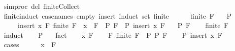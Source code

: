 \begin{isabellebody}
\endisatagML
{\isafoldML}%
%
\isadelimML
\isanewline
%
\endisadelimML
\isanewline
{}\isamarkupfalse%
\ {\isacharbrackleft}{\kern0pt}{\isacharbrackleft}{\kern0pt}simproc\ del{\isacharcolon}{\kern0pt}\ finite{\isacharunderscore}{\kern0pt}Collect{\isacharbrackright}{\kern0pt}{\isacharbrackright}{\kern0pt}\isanewline
\isanewline
{}\isamarkupfalse%
\ finite{\isacharunderscore}{\kern0pt}induct\ {\isacharbrackleft}{\kern0pt}case{\isacharunderscore}{\kern0pt}names\ empty\ insert{\isacharcomma}{\kern0pt}\ induct\ set{\isacharcolon}{\kern0pt}\ finite{\isacharbrackright}{\kern0pt}{\isacharcolon}{\kern0pt}\isanewline
\ \ %
\isanewline
\ \ \ {\isachardoublequoteopen}finite\ F{\isachardoublequoteclose}\isanewline
\ \ \ {\isachardoublequoteopen}P\ {\isacharbraceleft}{\kern0pt}{\isacharbraceright}{\kern0pt}{\isachardoublequoteclose}\isanewline
\ \ \ \ \ insert{\isacharcolon}{\kern0pt}\ {\isachardoublequoteopen}{\isasymAnd}x\ F{\isachardot}{\kern0pt}\ finite\ F\ {\isasymLongrightarrow}\ x\ {\isasymnotin}\ F\ {\isasymLongrightarrow}\ P\ F\ {\isasymLongrightarrow}\ P\ {\isacharparenleft}{\kern0pt}insert\ x\ F{\isacharparenright}{\kern0pt}{\isachardoublequoteclose}\isanewline
\ \ \ {\isachardoublequoteopen}P\ F{\isachardoublequoteclose}\isanewline
%
\isadelimproof
\ \ %
\endisadelimproof
%
\isatagproof
{}\isamarkupfalse%
\ {\isacartoucheopen}finite\ F{\isacartoucheclose}\isanewline
{}\isamarkupfalse%
\ induct\isanewline
\ \ \isamarkupfalse%
\ {\isachardoublequoteopen}P\ {\isacharbraceleft}{\kern0pt}{\isacharbraceright}{\kern0pt}{\isachardoublequoteclose}\ \isamarkupfalse%
\ fact\isanewline
{}\isamarkupfalse%
\isanewline
\ \ \isamarkupfalse%
\ x\ F\isanewline
\ \ \isamarkupfalse%
\ F{\isacharcolon}{\kern0pt}\ {\isachardoublequoteopen}finite\ F{\isachardoublequoteclose}\ \ P{\isacharcolon}{\kern0pt}\ {\isachardoublequoteopen}P\ F{\isachardoublequoteclose}\isanewline
\ \ \isamarkupfalse%
\ {\isachardoublequoteopen}P\ {\isacharparenleft}{\kern0pt}insert\ x\ F{\isacharparenright}{\kern0pt}{\isachardoublequoteclose}\isanewline
\ \ \isamarkupfalse%
\ cases\isanewline
\ \ \ \ \isamarkupfalse%
\ {\isachardoublequoteopen}x\ {\isasymin}\ F{\isachardoublequoteclose}\isanewline
\ \ \ \ \isamarkupfalse%
\ \isamarkupfalse%

\end{isabellebody}
